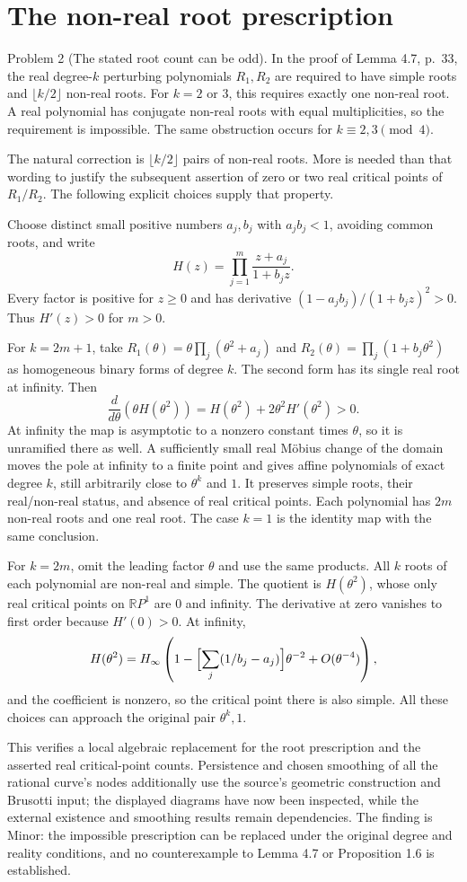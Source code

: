 \documentclass[10pt]{article}
\begin{document}
\section*{The non-real root prescription}
Problem 2 (The stated root count can be odd).  In the proof of Lemma 4.7, p. 33, the real degree-\(k\) perturbing polynomials \(R_1,R_2\) are required to have simple roots and \(\lfloor k/2\rfloor\) non-real roots. For \(k=2\) or \(3\), this requires exactly one non-real root. A real polynomial has conjugate non-real roots with equal multiplicities, so the requirement is impossible. The same obstruction occurs for \(k\equiv2,3\pmod4\).\par
The natural correction is \(\lfloor k/2\rfloor\) pairs of non-real roots. More is needed than that wording to justify the subsequent assertion of zero or two real critical points of \(R_1/R_2\). The following explicit choices supply that property.\par
Choose distinct small positive numbers \(a_j,b_j\) with \(a_jb_j<1\), avoiding common roots, and write \[H(z)=\prod_{j=1}^{m}\frac{z+a_j}{1+b_jz}.\] Every factor is positive for \(z\ge0\) and has derivative \((1-a_jb_j)/(1+b_jz)^2>0\). Thus \(H'(z)>0\) for \(m>0\).\par
For \(k=2m+1\), take \(R_1(\theta)=\theta\prod_j(\theta^2+a_j)\) and \(R_2(\theta)=\prod_j(1+b_j\theta^2)\) as homogeneous binary forms of degree \(k\). The second form has its single real root at infinity. Then \[\frac{d}{d\theta}\left(\theta H(\theta^2)\right)
 =H(\theta^2)+2\theta^2H'(\theta^2)>0.\] At infinity the map is asymptotic to a nonzero constant times \(\theta\), so it is unramified there as well. A sufficiently small real Möbius change of the domain moves the pole at infinity to a finite point and gives affine polynomials of exact degree \(k\), still arbitrarily close to \(\theta^k\) and \(1\). It preserves simple roots, their real/non-real status, and absence of real critical points. Each polynomial has \(2m\) non-real roots and one real root. The case \(k=1\) is the identity map with the same conclusion.\par
For \(k=2m\), omit the leading factor \(\theta\) and use the same products. All \(k\) roots of each polynomial are non-real and simple. The quotient is \(H(\theta^2)\), whose only real critical points on \(\mathbb RP^1\) are \(0\) and infinity. The derivative at zero vanishes to first order because \(H'(0)>0\). At infinity, \[H(\theta^2)=H_\infty
 \left(1-\Bigl[\sum_j(1/b_j-a_j)\Bigr]\theta^{-2}
       +O(\theta^{-4})\right),\] and the coefficient is nonzero, so the critical point there is also simple. All these choices can approach the original pair \(\theta^k,1\).\par
This verifies a local algebraic replacement for the root prescription and the asserted real critical-point counts. Persistence and chosen smoothing of all the rational curve’s nodes additionally use the source’s geometric construction and Brusotti input; the displayed diagrams have now been inspected, while the external existence and smoothing results remain dependencies. The finding is Minor: the impossible prescription can be replaced under the original degree and reality conditions, and no counterexample to Lemma 4.7 or Proposition 1.6 is established.\par
\end{document}
